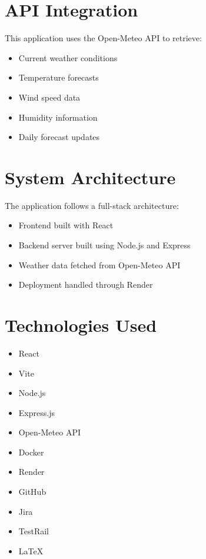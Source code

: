 \documentclass{article}
\begin{document}
\section{API Integration}

This application uses the Open-Meteo API to retrieve:

\begin{itemize}[leftmargin=*]
    \item Current weather conditions
    \item Temperature forecasts
    \item Wind speed data
    \item Humidity information
    \item Daily forecast updates
\end{itemize}

\section{System Architecture}

The application follows a full-stack architecture:

\begin{itemize}[leftmargin=*]
    \item Frontend built with React
    \item Backend server built using Node.js and Express
    \item Weather data fetched from Open-Meteo API
    \item Deployment handled through Render
\end{itemize}

\section{Technologies Used}

\begin{itemize}[leftmargin=*]
    \item React
    \item Vite
    \item Node.js
    \item Express.js
    \item Open-Meteo API
    \item Docker
    \item Render
    \item GitHub
    \item Jira
    \item TestRail
    \item LaTeX
\end{itemize}
\end{document}
